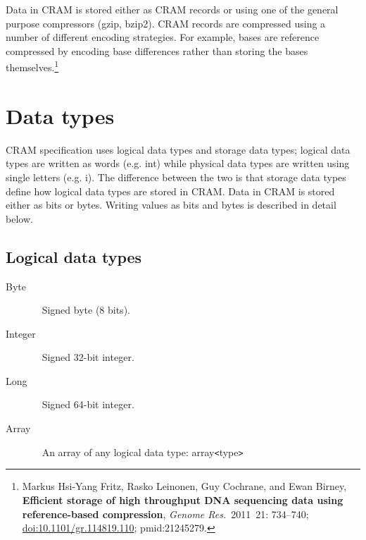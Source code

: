 \documentclass[a4paper]{article}
\begin{document}
Data in CRAM is stored either as CRAM records or using one of the general purpose 
compressors (gzip, bzip2). CRAM records are compressed using a number of different 
encoding strategies. For example, bases are reference compressed by encoding base
differences rather than storing the bases themselves.\footnote{Markus Hsi-Yang Fritz,
Rasko Leinonen, Guy Cochrane, and Ewan Birney,
\textbf{Efficient storage of high throughput DNA sequencing data using reference-based compression},
{\sl Genome Res.}~2011~21: 734--740;
\href{http://dx.doi.org/doi:10.1101/gr.114819.110}{doi:10.1101/gr.114819.110};
{\sc pmid:}21245279.}

\section{\textbf{Data types}}

CRAM specification uses logical data types and storage data types; logical data 
types are written as words (e.g. int) while physical data types are written using 
single letters (e.g. i). The difference between the two is that storage data types 
define how logical data types are stored in CRAM. Data in CRAM is stored either 
as bits or bytes. Writing values as bits and bytes is described in detail 
below.

\subsection{\textbf{Logical data types}}

\begin{description}
\item[Byte]\ \newline
Signed byte (8 bits).

\item[Integer]\ \newline
Signed 32-bit integer. 

\item[Long]\ \newline
Signed 64-bit integer. 

\item[Array]\ \newline
An array of any logical data type: array\texttt{<}type\texttt{>}
\end{description}

\end{document}
